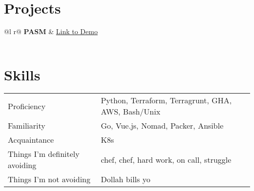 \documentclass[a4paper,12pt]{article}
\begin{document}
\section{Projects}

\begin{tabularx}{\linewidth}{ @{}l r@{} }
\textbf{PASM} & \hfill \href{https://some-link.com}{Link to Demo} \\[3.75pt]
  \\
\end{tabularx}

\section{Skills}
\begin{tabularx}{\linewidth}{@{}l X@{}}
Proficiency &  \normalsize{Python, Terraform, Terragrunt, GHA, AWS, Bash/Unix}\\
Familiarity  &  \normalsize{Go, Vue.js, Nomad, Packer, Ansible}\\
Acquaintance  & \normalsize{K8s}\\
Things I'm definitely avoiding & \normalsize{chef, chef, hard work, on call, struggle}\\
Things I'm not avoiding & \normalsize{Dollah bills yo}\\
\end{tabularx}

\vfill
{}
\end{document}
